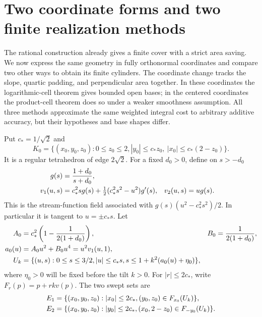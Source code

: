 \section{Two coordinate forms and two finite realization methods}
\label{c:rational-dictionary}

The rational construction already gives a finite cover with a strict
area saving.  We now express the same geometry in fully orthonormal
coordinates and compare two other ways to obtain its finite cylinders.
The coordinate change tracks the slope, quartic padding, and
perpendicular area together.  In these coordinates the logarithmic-cell
theorem gives bounded open bases; in the centered coordinates the
product-cell theorem does so under a weaker smoothness assumption.
All three methods approximate the same weighted integral cost to
arbitrary additive accuracy, but their hypotheses and base shapes differ.

Put $c_*=1/\sqrt2$ and
\begin{equation}\label{c:uncentered-tetrahedron}
 K_0=\{(x_0,y_0,z_0):0\le z_0\le2,
          |y_0|\le c_*z_0,\ |x_0|\le c_*(2-z_0)\}.
\end{equation}
It is a regular tetrahedron of edge $2\sqrt2$. For a fixed
$d_0>0$, define on $s>-d_0$
\begin{align}
 g(s)&=\frac{1+d_0}{s+d_0},\notag\\
 v_1(u,s)&=c_*^2s g(s)+\tfrac12(c_*^2s^2-u^2)g'(s),
 &v_2(u,s)&=u g(s).\label{c:uncentered-field}
\end{align}
This is the stream-function field associated with
$g(s)(u^2-c_*^2s^2)/2$. In particular it is tangent to
$u=\pm c_*s$. Let
\begin{align}
 A_0&=c_*^2\left(1-\frac1{2(1+d_0)}\right),&
 B_0&=\frac1{2(1+d_0)},\notag\\
 a_0(u)&=A_0u^2+B_0u^4=u^2v_1(u,1),\label{c:uncentered-polynomial}\\
 U_k&=\{(u,s):0\le s\le3/2, |u|\le c_*s,
                   s\le1+k^2(a_0(u)+\eta_0)\},\notag
\end{align}
where $\eta_0>0$ will be fixed before the tilt $k>0$.
For $|r|\le2c_*$, write $F_r(p)=p+rk v(p)$. The two swept sets are
\begin{align}
 E_1&=\{(x_0,y_0,z_0):|x_0|\le2c_*, (y_0,z_0)\in F_{x_0}(U_k)\},\notag\\
 E_2&=\{(x_0,y_0,z_0):|y_0|\le2c_*, (x_0,2-z_0)\in F_{-y_0}(U_k)\}.
 \label{c:uncentered-sweeps}
\end{align}

